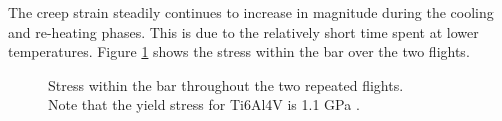 \documentclass[conf]{new-aiaa}
\begin{document}
The creep strain steadily continues to increase in magnitude 
during the cooling and re-heating phases.
This is due to the relatively short time spent at lower
temperatures.
Figure \ref{fig_full_bar_stress} shows
the stress within the bar over the two flights.


\begin{figure}[H]
  \centering
  \caption{ Stress within the bar throughout the two repeated flights. \\
            Note that the yield stress for Ti6Al4V is 1.1 GPa 
            \cite{boyer_materials_properties_handbook_titanium_alloys}. }
  \label{fig_full_bar_stress}
\end{figure}

\end{document}
